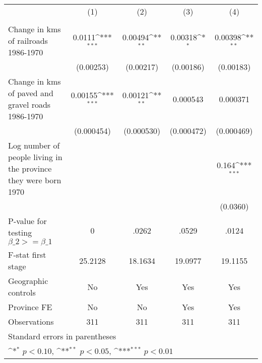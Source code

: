 {
\def\sym#1{\ifmmode^{#1}\else\(^{#1}\)\fi}
\begin{tabular}{l*{4}{c}}
\hline\hline
                &\multicolumn{1}{c}{(1)}&\multicolumn{1}{c}{(2)}&\multicolumn{1}{c}{(3)}&\multicolumn{1}{c}{(4)}\\
                &\multicolumn{1}{c}{}&\multicolumn{1}{c}{}&\multicolumn{1}{c}{}&\multicolumn{1}{c}{}\\
\hline
Change in kms of railroads 1986-1970&   0.0111\sym{***}&  0.00494\sym{**} &  0.00318\sym{*}  &  0.00398\sym{**} \\
                &(0.00253)         &(0.00217)         &(0.00186)         &(0.00183)         \\
[1em]
Change in kms of paved and gravel roads 1986-1970&  0.00155\sym{***}&  0.00121\sym{**} & 0.000543         & 0.000371         \\
                &(0.000454)         &(0.000530)         &(0.000472)         &(0.000469)         \\
[1em]
Log number of people living in the province they were born 1970&                  &                  &                  &    0.164\sym{***}\\
                &                  &                  &                  & (0.0360)         \\
\hline
P-value for testing $\beta\_{2} >= \beta\_{1}$&        0         &    .0262         &    .0529         &    .0124         \\
F-stat first stage&  25.2128         &  18.1634         &  19.0977         &  19.1155         \\
Geographic controls&       No         &      Yes         &      Yes         &      Yes         \\
Province FE     &       No         &       No         &      Yes         &      Yes         \\
Observations    &      311         &      311         &      311         &      311         \\
\hline\hline
\multicolumn{5}{l}{\footnotesize Standard errors in parentheses}\\
\multicolumn{5}{l}{\footnotesize \sym{*} \(p<0.10\), \sym{**} \(p<0.05\), \sym{***} \(p<0.01\)}\\
\end{tabular}
}
